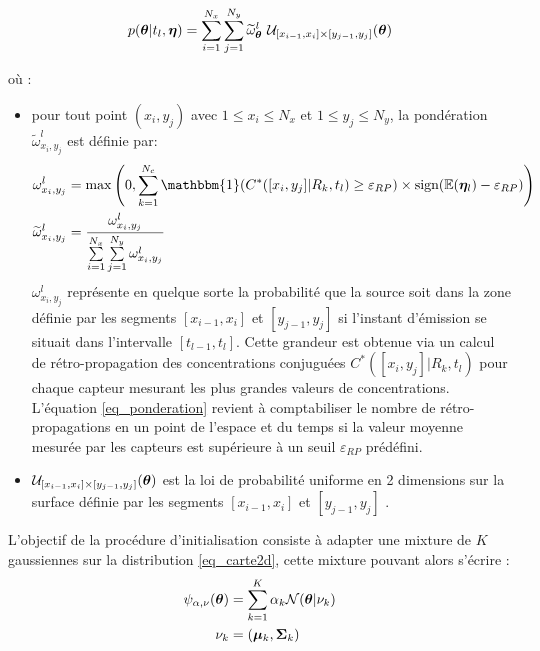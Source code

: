 \begin{equation}
p({\bm{\theta}} | t_l,{\bm{\eta}}) = \sum\limits_{i=1}^{N_x} \sum\limits_{j=1}^{N_y} \widetilde{\omega}_{{\bm{\theta}}}^l ~  \mathcal{U}_{[x_{i-1},x_i]\times [y_{j-1},y_j]}({\bm{\theta}})
\label{eq_carte2d}
\end{equation}

où :
\begin{itemize}
	\item pour tout point $(x_i,y_j)$ avec $1\leq x_i \leq N_x$ et $1 \leq y_j \leq N_y$, la pondération $\widetilde{\omega}_{x_i,y_j}^l$ est définie par:
	\begin{equation}
		\begin{split}
			\omega_{x_i,y_j}^l &= \max\left(0, \sum\limits_{k=1}^{N_c} \mathbbm{1}(C^*([x_i,y_j] | R_k,t_l) \geq \varepsilon_{RP}) \times \text{sign}(\mathbb{E}(\VecObs_l) - \varepsilon_{RP})\right) \\
			\widetilde{\omega}_{x_i,y_j}^l &= \dfrac{\omega_{x_i,y_j}^l}{\sum\limits_{i=1}^{N_x}\sum\limits_{j=1}^{N_y}\omega_{x_i,y_j}^l}
		\end{split}
		\label{eq_ponderation}
	\end{equation}
	$\omega_{x_i,y_j}^l$ représente en quelque sorte la probabilité que la source soit dans la zone définie par les segments $[x_{i-1},x_i]$ et $[y_{j-1},y_j]$ si l'instant d'émission se situait dans l'intervalle $[t_{l-1},t_l]$. Cette grandeur est obtenue via un calcul de rétro-propagation des concentrations conjuguées $C^*([x_i,y_j] | R_k,t_l) $ pour chaque capteur mesurant les plus grandes valeurs de concentrations. L'équation \eqref{eq_ponderation} revient à comptabiliser le nombre de rétro-propagations en un point de l'espace et du temps si la valeur moyenne mesurée par les capteurs est supérieure à un seuil $\varepsilon_{RP}$ prédéfini. 
	\item $\mathcal{U}_{[x_{i-1},x_i]\times [y_{j-1},y_j]}({\bm{\theta}})$ est la loi de probabilité uniforme en 2 dimensions sur la surface définie par les segments $[x_{i-1},x_i]$ et $[y_{j-1},y_j]$ . \\
\end{itemize}

L'objectif de la procédure d'initialisation consiste à adapter une mixture de $K$ gaussiennes sur la distribution \eqref{eq_carte2d}, cette mixture pouvant alors s'écrire : 
\begin{equation}
\begin{split}
\psi_{\alpha, \nu}({\bm{\theta}}) &= \sum\limits_{k=1}^K \alpha_k \mathcal{N}({\bm{\theta}} | \nu_k) \\
\nu_k &= ({\bm{\mu}}_k, {\bm{\Sigma}}_k)
\end{split}
\end{equation}


